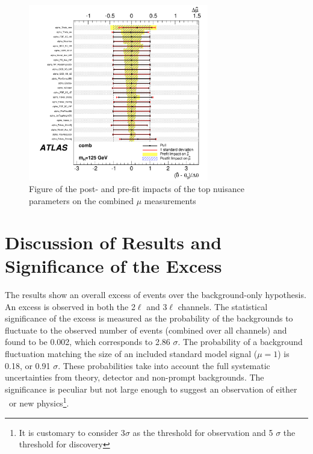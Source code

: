 \begin{figure}[htbp]
\begin{center}
\includegraphics[width=0.7\textwidth]{figs/results/nuisance.pdf}
\caption{Figure of the post- and pre-fit impacts of the top nuisance parameters on the combined $\mu$ measurements}
\label{figure:results_nuisance}
\end{center}
\end{figure}



\section{Discussion of Results and Significance of the Excess}

The results show an overall excess of events over the background-only hypothesis. An excess is observed in both the 2$\ell$ and 3$\ell$ channels. The statistical significance of the excess is measured as the probability of the backgrounds to fluctuate to the observed number of events (combined over all channels) and found to be 0.002, which corresponds to 2.86 $\sigma$. The probability of a background fluctuation matching the size of an included standard model signal ($\mu=1$) is 0.18, or 0.91 $\sigma$. These probabilities take into account the full systematic uncertainties from theory, detector and non-prompt backgrounds. The significance is peculiar but not large enough to suggest an observation of either \tth\ or new physics\footnote{It is customary to consider 3$\sigma$ as the threshold for observation and 5 $\sigma$ the threshold for discovery}. 

